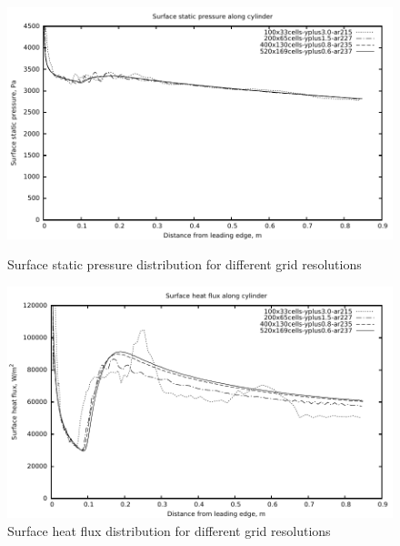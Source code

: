 \begin{figure}[h]
 \begin{center}
  \includegraphics[width=15cm]{./chap3-mallinson-cylinder/figs/compare-grid-resolution-pressure.pdf}
 \end{center}
 \caption{Surface static pressure distribution for different grid resolutions}
 \label{cylinder-surface-static-pressure-compare-grid}
\vspace{2cm}
 \begin{center}
  \includegraphics[width=15cm]{./chap3-mallinson-cylinder/figs/compare-grid-resolution-heat-flux.pdf}
 \end{center}
 \caption{Surface heat flux distribution for different grid resolutions}
 \label{cylinder-surface-heat-flux-compare-grid}
\end{figure}

